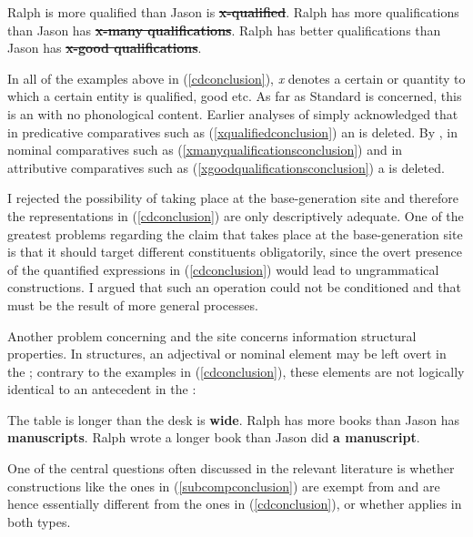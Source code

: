 \ea \label{cdconclusion}
\ea	Ralph is more qualified than Jason is \sout{\textbf{x-qualified}}. \label{xqualifiedconclusion}
\ex	Ralph has more qualifications than Jason has \sout{\textbf{x-many qualifications}}. \label{xmanyqualificationsconclusion}
\ex	Ralph has better qualifications than Jason has \sout{\textbf{x-good qualifications}}. \label{xgoodqualificationsconclusion}
\z
\z
	
In all of the examples above in (\ref{cdconclusion}), \textit{x} denotes a certain  or quantity to which a certain entity is qualified, good etc. As far as Standard  is concerned, this is an  with no phonological content. Earlier analyses of  simply acknowledged that in predicative comparatives such as (\ref{xqualifiedconclusion}) an  is deleted. By , in nominal comparatives such as (\ref{xmanyqualificationsconclusion}) and in attributive comparatives such as (\ref{xgoodqualificationsconclusion}) a  is deleted.

I rejected the possibility of  taking place at the base-generation site and therefore the representations in (\ref{cdconclusion}) are only descriptively adequate. One of the greatest problems regarding the claim that  takes place at the base-generation site is that it should target different constituents obligatorily, since the overt presence of the quantified expressions in (\ref{cdconclusion}) would lead to ungrammatical constructions. I argued that such an operation could not be conditioned and that  must be the result of more general processes.

Another problem concerning  and the  site concerns information structural properties. In  structures, an adjectival or nominal element may be left overt in the ; contrary to the examples in (\ref{cdconclusion}), these elements are not logically identical to an antecedent in the :

\ea \label{subcompconclusion}
\ea	The table is longer than the desk is \textbf{wide}.
\ex	Ralph has more books than Jason has \textbf{manuscripts}.
\ex	Ralph wrote a longer book than Jason did \textbf{a manuscript}.
\z
\z

One of the central questions often discussed in the relevant literature is whether constructions like the ones in (\ref{subcompconclusion}) are exempt from  and are hence essentially different from the ones in (\ref{cdconclusion}), or whether  applies in both types.

